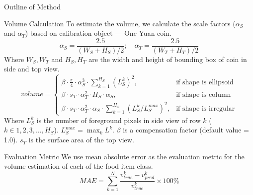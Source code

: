 \documentclass{beamer}
\begin{document}
	\begin{frame}{Outline of Method}
		\begin{block}{Volume Calculation}\tiny
			To estimate the volume\cite{vol}, we calculate the scale factors ($\alpha_S$ and $\alpha_T$) based on calibration object --- One Yuan coin.
			\begin{equation}
				\alpha_S = \frac{2.5}{(W_S + H_S)/2}; \quad
				\alpha_T = \frac{2.5}{(W_T + H_T)/2}
			\end{equation}
			Where $W_S, W_T$ and $H_S, H_T$ are the width and height of bounding box of coin in side and top view.
			\begin{equation}\label{E:vol}
				volume = 
				\begin{cases}
					\beta \cdot \frac{\pi}{4} \cdot \alpha_S^3 \cdot \sum_{k=1}^{H_S} (L^k_S)^2, &\text{if shape is ellipsoid} \\
					\beta \cdot  s_T \cdot \alpha_T^2 \cdot H_S \cdot \alpha_S, &\text{if shape is column} \\
					\beta \cdot  s_T \cdot \alpha_T^2 \cdot \alpha_S \cdot \sum_{k=1}^{H_S} \left(L^k_S/L_S^{max}\right)^2, &\text{if shape is irregular} 
				\end{cases}
			\end{equation}
			Where $L^k_S$ is the number of foreground pixels in side view of row $k$ ($k \in 1, 2, 3, \dots , H_S$). $L^{max}_S = \max_{k} L^k$. $\beta$ is a compensation factor (default value = 1.0).  $s_T$ is the surface area of the top view.
		\end{block}\pause
		\begin{block}{Evaluation Metric}\tiny
			We use mean absolute error as the evaluation metric for the volume estimation of each of the food item class.
			\begin{equation}
				MAE = \sum_{k=1}^{N} \frac{v_{true}^k-v_{pred}^k}{v_{true}^k}\times 100 \%
			\end{equation}
		\end{block}
	\end{frame}
	
\end{document}
